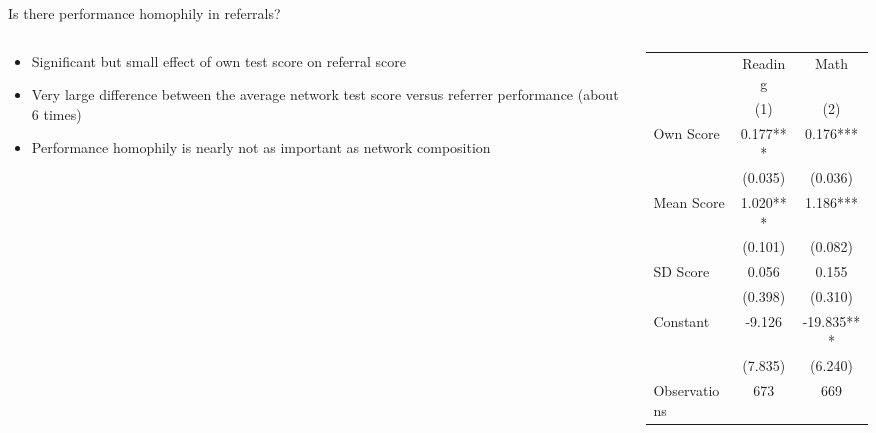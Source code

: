 \documentclass[aspectratio=169,xcolor=dvipsnames]{beamer}
\begin{document}
\begin{frame}{Is there performance homophily in referrals?}
    \begin{columns}[T]
        \begin{column}{0.42\textwidth}
            \vspace{2em}
            \begin{itemize}
                \item Significant but small effect of own test score on referral score
                \item Very large difference between the average network test score versus referrer performance (about 6 times)
                \item Performance homophily is nearly not as important as network composition
            \end{itemize}
        \end{column}
        \begin{column}{0.58\textwidth}
            \begin{table}
                \centering
                \footnotesize
                \begin{tabular}{lcc}
                \toprule
                 & \multicolumn{1}{c}{Reading} & \multicolumn{1}{c}{Math} \\
                 & \multicolumn{1}{c}{(1)} & \multicolumn{1}{c}{(2)} \\
                \midrule
                Own Score & 0.177*** & 0.176*** \\
                 & (0.035) & (0.036) \\
                Mean Score & 1.020*** & 1.186*** \\ 
                 & (0.101) & (0.082) \\
                SD Score & 0.056 & 0.155 \\
                 & (0.398) & (0.310) \\
                Constant & -9.126 & -19.835*** \\
                 & (7.835) & (6.240) \\
                \midrule
                Observations & 673 & 669 \\
                \bottomrule
                \end{tabular}
            \end{table}
        \end{column}
    \end{columns}
\end{frame}
\end{document}
